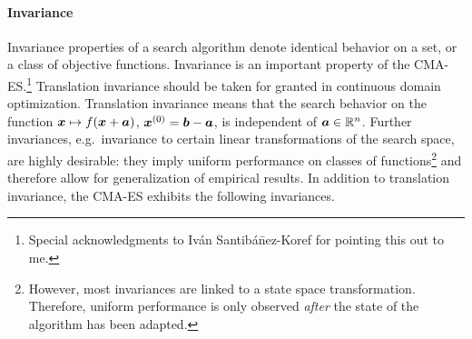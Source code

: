 \documentclass{article} %
\newcommand{\tutorial}[1]{{#1}}
\newcommand{\R}{\mathbb{R}}
\newcommand{\kom}[1]{}
\newcommand{\ve}[1]{\mathchoice{\mbox{\boldmath$\displaystyle#1$}}
  {\mbox{\boldmath$\textstyle#1$}} {\mbox{\boldmath$\scriptstyle#1$}}
  {\mbox{\boldmath$\scriptscriptstyle#1$}}}
\newcommand{\emphindex}[1]{\emph{#1}\index{#1}}
\newcommand{\N}{\ensuremath{n}}
\newcommand{\Rn}{\R^{\N}}
\begin{document}
%
\paragraph{Invariance}
{Invariance properties} of a search
algorithm denote identical behavior on a set, or a class of objective
functions. Invariance is an important property of the
CMA-ES.\footnote{Special acknowledgments to Iv\'{a}n
Santib\'{a}\={n}ez-Koref for pointing this out to
me.}\kom{For example, let $f:\Rn\to\R, \vx\mapsto f(\vx)$ and
$\vx^{(0)}=\in[0,1]^n$.  Then,
\emphindex{scale invariance} means identical search behavior on all
$f_\alpha: \vx\mapsto f(\alpha\vx),
\vx^{(0)}=\frac{1}{\alpha}\va$, for all $\alpha\not=0$. Invariances
are highly desirable: }
%
Translation invariance should be taken for granted in continuous
domain optimization. Translation invariance means that the search
behavior on the function $\ve{x}\mapsto f(\ve{x}+\ve{a})$,
$\ve{x}^{(0)} = \ve{b}-\ve{a}$, is independent of $\ve{a}\in\Rn$.
Further invariances, e.g.\ invariance to certain linear transformations of the
search space, are highly desirable: they imply uniform performance on
classes of functions\footnote{%
%
However, most invariances are linked to a state space transformation. Therefore, uniform performance is only observed \emph{after} the state of the algorithm has been adapted.
}
and therefore allow for generalization of
empirical results.  In addition to translation invariance, the CMA-ES\tutorial{ exhibits} the following invariances.
\end{document}
